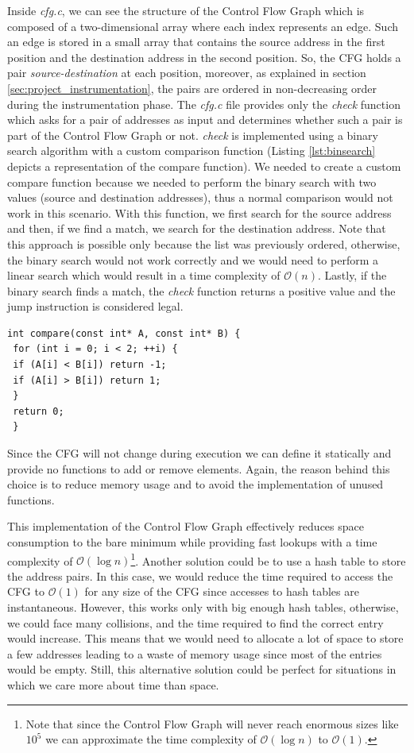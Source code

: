 Inside \textit{cfg.c}, we can see the structure of the Control Flow Graph which
is composed of a two-dimensional array where each index represents an edge. Such
an edge is stored in a small array that contains the source address in the first
position and the destination address in the second position. So, the CFG holds a
pair \textit{source-destination} at each position, moreover, as explained in
section \ref{sec:project_instrumentation}, the pairs are ordered in non-decreasing
order during the instrumentation phase. The \textit{cfg.c} file provides only the
\textit{check} function which asks for a pair of addresses as input and
determines whether such a pair is part of the Control Flow Graph or not. \textit{check}
is implemented using a binary search algorithm with a custom comparison function
(Listing \ref{lst:binsearch} depicts a representation of the compare function). We
needed to create a custom compare function because we needed to perform the binary
search with two values (source and destination addresses), thus a normal
comparison would not work in this scenario. With this function, we first search
for the source address and then, if we find a match, we search for the
destination address. Note that this approach is possible only because the list was
previously ordered, otherwise, the binary search would not work correctly and we
would need to perform a linear search which would result in a time complexity of
$\mathcal{O}(n)$. Lastly, if the binary search finds a match, the \textit{check}
function returns a positive value and the jump instruction is considered legal.
\\
\begin{lstlisting}[style=CStyle, caption= Comparison for binary search, label={lst:binsearch}]
 int compare(const int* A, const int* B) {
 for (int i = 0; i < 2; ++i) {
 if (A[i] < B[i]) return -1;
 if (A[i] > B[i]) return 1;
 }
 return 0;
 }
\end{lstlisting}

Since the CFG will not change during execution we can define it statically and provide
no functions to add or remove elements. Again, the reason behind this choice is to
reduce memory usage and to avoid the implementation of unused functions.

This implementation of the Control Flow Graph effectively reduces space consumption
to the bare minimum while providing fast lookups with a time complexity of $\mathcal{O}
(\log{n})$\footnote{Note that since the Control Flow Graph will never reach
enormous sizes like $10^{5}$ we can approximate the time complexity of
$\mathcal{O}(\log{n})$ to $\mathcal{O}(1)$.}. Another solution could be to use a
hash table to store the address pairs. In this case, we would reduce the time required
to access the CFG to $\mathcal{O}(1)$ for any size of the CFG since accesses to hash
tables are instantaneous. However, this works only with big enough hash tables,
otherwise, we could face many collisions, and the time required to find the
correct entry would increase. This means that we would need to allocate a lot of
space to store a few addresses leading to a waste of memory usage since most of the
entries would be empty. Still, this alternative solution could be perfect for situations
in which we care more about time than space.

